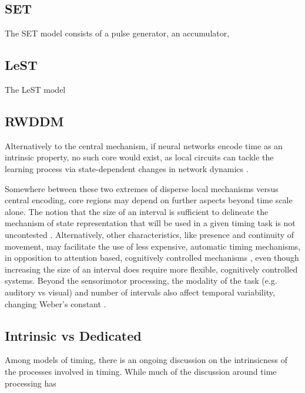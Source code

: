     \subsection{SET}
        The SET model consists of a pulse generator, an accumulator, 
        
    \subsection{LeST}
        The LeST model 
    
    \subsection{RWDDM}
    
            Alternatively to the central mechanism, if neural networks encode time as an intrinsic property, no such core would exist, as local circuits can tackle the learning process via state-dependent changes in network dynamics \cite{mauk2004neural, paton2018neural, buonomano1995temporal, motanis2018short}. 
        
        Somewhere between these two extremes of disperse local mechanisms versus central encoding, core regions may depend on further aspects beyond time scale alone. The notion that the size of an interval is sufficient to delineate the mechanism of state representation that will be used in a given timing task is not uncontested \cite{van20168}. Alternatively, other characteristics, like presence and continuity of movement, may facilitate the use of less expensive, automatic timing mechanisms, in opposition to attention based, cognitively controlled mechanisms \cite{lewis2003distinct}, even though increasing the size of an interval does require more flexible, cognitively controlled systems. Beyond the sensorimotor processing, the modality of the task (e.g. auditory vs visual) and number of intervals also affect temporal variability, changing Weber's constant \cite{merchant2008we}.

    \subsection{Intrinsic vs Dedicated}
        Among models of timing, there is an ongoing discussion on the intrinsicness of the processes involved in timing. While much of the discussion around time processing has 
